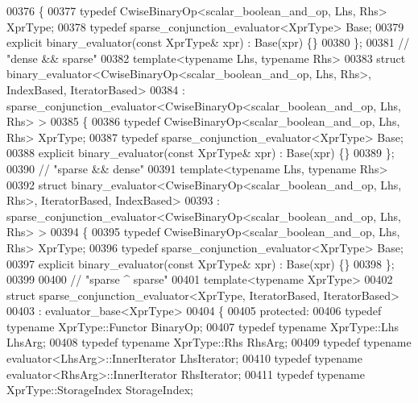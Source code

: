 \begin{DoxyCode}
00376 \{
00377   \textcolor{keyword}{typedef} CwiseBinaryOp<scalar\_boolean\_and\_op, Lhs, Rhs> XprType;
00378   \textcolor{keyword}{typedef} sparse\_conjunction\_evaluator<XprType> Base;
00379   \textcolor{keyword}{explicit} binary\_evaluator(\textcolor{keyword}{const} XprType& xpr) : Base(xpr) \{\}
00380 \};
00381 \textcolor{comment}{// "dense && sparse"}
00382 \textcolor{keyword}{template}<\textcolor{keyword}{typename} Lhs, \textcolor{keyword}{typename} Rhs>
00383 \textcolor{keyword}{struct }binary\_evaluator<CwiseBinaryOp<scalar\_boolean\_and\_op, Lhs, Rhs>, IndexBased, IteratorBased>
00384   : sparse\_conjunction\_evaluator<CwiseBinaryOp<scalar\_boolean\_and\_op, Lhs, Rhs> >
00385 \{
00386   \textcolor{keyword}{typedef} CwiseBinaryOp<scalar\_boolean\_and\_op, Lhs, Rhs> XprType;
00387   \textcolor{keyword}{typedef} sparse\_conjunction\_evaluator<XprType> Base;
00388   \textcolor{keyword}{explicit} binary\_evaluator(\textcolor{keyword}{const} XprType& xpr) : Base(xpr) \{\}
00389 \};
00390 \textcolor{comment}{// "sparse && dense"}
00391 \textcolor{keyword}{template}<\textcolor{keyword}{typename} Lhs, \textcolor{keyword}{typename} Rhs>
00392 \textcolor{keyword}{struct }binary\_evaluator<CwiseBinaryOp<scalar\_boolean\_and\_op, Lhs, Rhs>, IteratorBased, IndexBased>
00393   : sparse\_conjunction\_evaluator<CwiseBinaryOp<scalar\_boolean\_and\_op, Lhs, Rhs> >
00394 \{
00395   \textcolor{keyword}{typedef} CwiseBinaryOp<scalar\_boolean\_and\_op, Lhs, Rhs> XprType;
00396   \textcolor{keyword}{typedef} sparse\_conjunction\_evaluator<XprType> Base;
00397   \textcolor{keyword}{explicit} binary\_evaluator(\textcolor{keyword}{const} XprType& xpr) : Base(xpr) \{\}
00398 \};
00399 
00400 \textcolor{comment}{// "sparse ^ sparse"}
00401 \textcolor{keyword}{template}<\textcolor{keyword}{typename} XprType>
00402 \textcolor{keyword}{struct }sparse\_conjunction\_evaluator<XprType, IteratorBased, IteratorBased>
00403   : evaluator\_base<XprType>
00404 \{
00405 \textcolor{keyword}{protected}:
00406   \textcolor{keyword}{typedef} \textcolor{keyword}{typename} XprType::Functor BinaryOp;
00407   \textcolor{keyword}{typedef} \textcolor{keyword}{typename} XprType::Lhs LhsArg;
00408   \textcolor{keyword}{typedef} \textcolor{keyword}{typename} XprType::Rhs RhsArg;
00409   \textcolor{keyword}{typedef} \textcolor{keyword}{typename} evaluator<LhsArg>::InnerIterator  LhsIterator;
00410   \textcolor{keyword}{typedef} \textcolor{keyword}{typename} evaluator<RhsArg>::InnerIterator  RhsIterator;
00411   \textcolor{keyword}{typedef} \textcolor{keyword}{typename} XprType::StorageIndex StorageIndex;

\end{DoxyCode}
